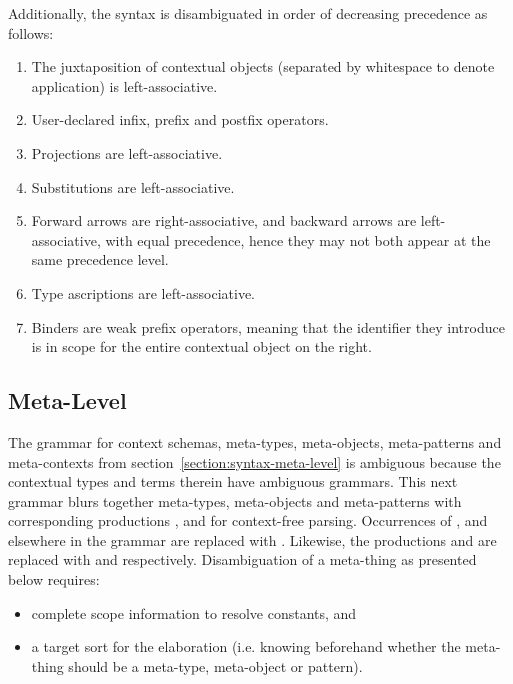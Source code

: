 Additionally, the syntax is disambiguated in order of decreasing precedence as follows:

\begin{enumerate}
\item The juxtaposition of contextual \LF objects (separated by whitespace to denote application) is left-associative.
\item User-declared infix, prefix and postfix operators.
\item Projections are left-associative.
\item Substitutions are left-associative.
\item Forward arrows are right-associative, and backward arrows are left-associative, with equal precedence, hence they may not both appear at the same precedence level.
\item Type ascriptions are left-associative.
\item Binders are weak prefix operators, meaning that the identifier they introduce is in scope for the entire contextual \LF object on the right.
\end{enumerate}

\subsection{Meta-Level}

The grammar for context schemas, meta-types, meta-objects, meta-patterns and meta-contexts from section~\ref{section:syntax-meta-level} is ambiguous because the contextual \LF types and terms therein have ambiguous grammars.
This next grammar blurs together meta-types, meta-objects and meta-patterns with corresponding productions ,  and  for context-free parsing.
Occurrences of ,  and  elsewhere in the grammar are replaced with .
Likewise, the productions  and  are replaced with  and  respectively.
Disambiguation of a meta-thing as presented below requires:
\begin{itemize}
\item complete scope information to resolve constants, and
\item a target sort for the elaboration (i.e. knowing beforehand whether the meta-thing should be a meta-type, meta-object or pattern).
\end{itemize}

